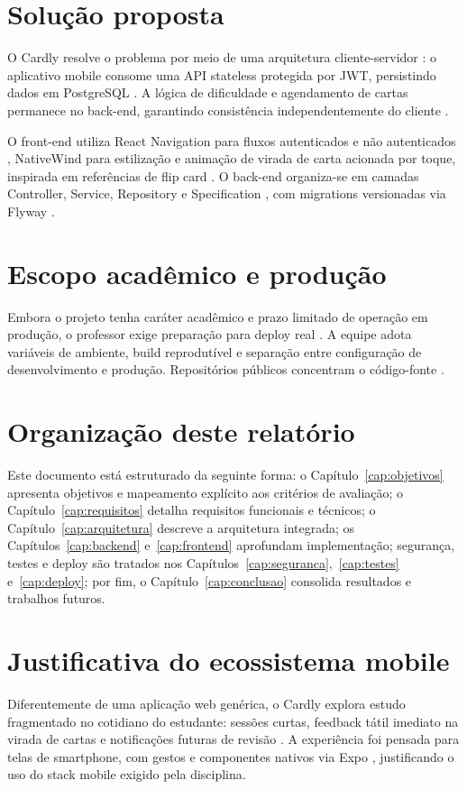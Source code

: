 \section{Solução proposta}

O Cardly resolve o problema por meio de uma arquitetura cliente-servidor \cite{tanenbaum2015,rest_fielding}: o aplicativo mobile consome uma API stateless protegida por JWT, persistindo dados em PostgreSQL \cite{postgresql_docs}. A lógica de dificuldade e agendamento de cartas permanece no back-end, garantindo consistência independentemente do cliente \cite{clean_architecture_martin}.

O front-end utiliza React Navigation para fluxos autenticados e não autenticados \cite{react_navigation}, NativeWind para estilização \cite{nativewind_docs,tailwind_docs} e animação de virada de carta acionada por toque, inspirada em referências de flip card \cite{w3schools_flip,reanimated_docs}. O back-end organiza-se em camadas Controller, Service, Repository e Specification \cite{spring_boot_docs,jpa_specification}, com migrations versionadas via Flyway \cite{flyway_docs}.

\section{Escopo acadêmico e produção}

Embora o projeto tenha caráter acadêmico e prazo limitado de operação em produção, o professor exige preparação para deploy real \cite{twelve_factor,vercel_docs,railway_docs}. A equipe adota variáveis de ambiente, build reprodutível e separação entre configuração de desenvolvimento e produção. Repositórios públicos concentram o código-fonte \cite{cardly_backend_repo,cardly_frontend_repo}.

\section{Organização deste relatório}

Este documento está estruturado da seguinte forma: o Capítulo~\ref{cap:objetivos} apresenta objetivos e mapeamento explícito aos critérios de avaliação; o Capítulo~\ref{cap:requisitos} detalha requisitos funcionais e técnicos; o Capítulo~\ref{cap:arquitetura} descreve a arquitetura integrada; os Capítulos~\ref{cap:backend} e~\ref{cap:frontend} aprofundam implementação; segurança, testes e deploy são tratados nos Capítulos~\ref{cap:seguranca},~\ref{cap:testes} e~\ref{cap:deploy}; por fim, o Capítulo~\ref{cap:conclusao} consolida resultados e trabalhos futuros.

\section{Justificativa do ecossistema mobile}

Diferentemente de uma aplicação web genérica, o Cardly explora estudo fragmentado no cotidiano do estudante: sessões curtas, feedback tátil imediato na virada de cartas e notificações futuras de revisão \cite{mobile_first_nielsen}. A experiência foi pensada para telas de smartphone, com gestos e componentes nativos via Expo \cite{expo_docs,youtube_expo_typescript}, justificando o uso do stack mobile exigido pela disciplina.
